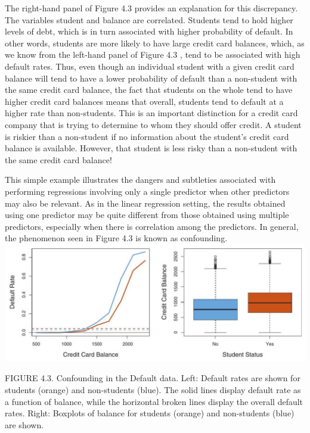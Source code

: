 \documentclass[10pt]{article}
\begin{document}
The right-hand panel of Figure 4.3 provides an explanation for this discrepancy. The variables student and balance are correlated. Students tend to hold higher levels of debt, which is in turn associated with higher probability of default. In other words, students are more likely to have large credit card balances, which, as we know from the left-hand panel of Figure 4.3 , tend to be associated with high default rates. Thus, even though an individual student with a given credit card balance will tend to have a lower probability of default than a non-student with the same credit card balance, the fact that students on the whole tend to have higher credit card balances means that overall, students tend to default at a higher rate than non-students. This is an important distinction for a credit card company that is trying to determine to whom they should offer credit. A student is riskier than a non-student if no information about the student's credit card balance is available. However, that student is less risky than a non-student with the same credit card balance!

This simple example illustrates the dangers and subtleties associated with performing regressions involving only a single predictor when other predictors may also be relevant. As in the linear regression setting, the results obtained using one predictor may be quite different from those obtained using multiple predictors, especially when there is correlation among the predictors. In general, the phenomenon seen in Figure 4.3 is known as confounding.\\
\includegraphics[max width=\textwidth, center]{2025_05_05_efe77898333945044de4g-152}

FIGURE 4.3. Confounding in the Default data. Left: Default rates are shown for students (orange) and non-students (blue). The solid lines display default rate as a function of balance, while the horizontal broken lines display the overall default rates. Right: Boxplots of balance for students (orange) and non-students (blue) are shown.
\end{document}
